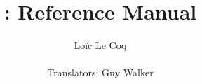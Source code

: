 \documentclass[a4paper,11pt]{book}
\author{Loïc Le Coq\\ \\ Translators: Guy Walker}
\title{
\Huge \textbf{\xlogo: Reference Manual} 
}
\date{
\today
\begin{center}
\texttt{[image: pics/title.png]}
\end{center}
\texttt{http://xlogo.tuxfamily.org}
}
\begin{document}
\renewcommand{\labelitemi}{\textbullet}
\renewcommand{\labelitemiii}{$\rightarrow$} 
\maketitle

\tableofcontents













\appendix






\printindex
\end{document}
